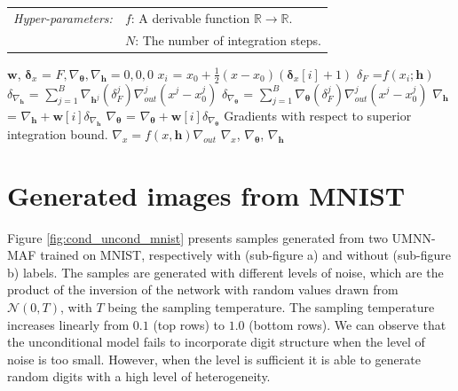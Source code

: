 \begin{algorithm}[H]
\begin{tabular}{ll}
     \textit{Hyper-parameters:} & $f$: A derivable function $\mathbb{R}\rightarrow \mathbb{R}$.\\
     &$N$: The number of integration steps.
\end{tabular}
\small
\begin{algorithmic}[1]
\State $\mathbf{w}$, $\mathbf{\delta}_x$ =  
\State $F, \nabla_{\mathbf{\theta}}, \nabla_{\mathbf{h}} = 0, 0, 0$
\State $x_i$ = $x_0 + \frac{1}{2} (x - x_0)(\mathbf{\delta}_x[i] + 1)$
\State $\delta_F$ =$f(x_i; \mathbf{h})$
\State $\delta_{\nabla_{\mathbf{h}}}$ = $ \sum_{j=1}^{B} \nabla_{{\mathbf{h}}^j}\left(\delta_F^j\right) \nabla_{out}^j (x^j-x_0^j)$
\State $\delta_{\nabla_{\mathbf{\theta}}}$ = $ \sum_{j=1}^{B} \nabla_{\mathbf{\theta}}\left(\delta_F^j\right) \nabla_{out}^j (x^j-x_0^j)$
\State $\nabla_{\mathbf{h}}$ = $\nabla_{\mathbf{h}} + \mathbf{w}[i] \delta_{\nabla_{\mathbf{h}}}$
\State $\nabla_{\mathbf{\theta}}$ = $\nabla_{\mathbf{\theta}} + \mathbf{w}[i] \delta_{\nabla_{\mathbf{\theta}}}$
\EndFor
\LineComment Gradients with respect to superior integration bound.
\State $\nabla_x = f(x, \mathbf{h}) \nabla_{out}$
\State \Return $\nabla_x$, $\nabla_{\mathbf{\theta}}$, $\nabla_{\mathbf{h}}$
\EndProcedure
\end{algorithmic}
\vspace{1em}
\endgroup
\end{algorithm}

\section{Generated images from MNIST}\label{app:supp_results}
Figure \ref{fig:cond_uncond_mnist} presents samples generated from two UMNN-MAF trained on MNIST, respectively with (sub-figure a) and without (sub-figure b) labels. The samples are generated with different levels of noise, which are the product of the inversion of the network with random values drawn from $\mathcal{N}(0, T)$, with $T$ being the sampling temperature. The sampling temperature increases linearly from $0.1$ (top rows) to $1.0$ (bottom rows). We can observe that the unconditional model fails to incorporate digit structure when the level of noise is too small. However, when the level is sufficient it is able to generate random digits with a high level of heterogeneity.

